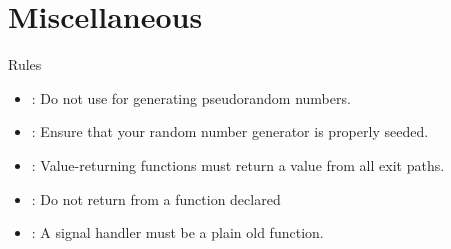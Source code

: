 \section{Miscellaneous}

\begin{frame}[t]{Rules}
\begin{itemize}
  \item {}: 
        Do not use  for generating pseudorandom numbers.
  \vfill
  \item {}: 
        Ensure that your random number generator is properly seeded.
  \vfill
  \item {}: 
        Value-returning functions must return a value from all exit paths.
  \vfill
  \item {}: 
        Do not return from a function declared \cppkey{[[noreturn]]}
  \vfill
  \item {}: 
        A signal handler must be a plain old function.
\end{itemize}
\end{frame}


